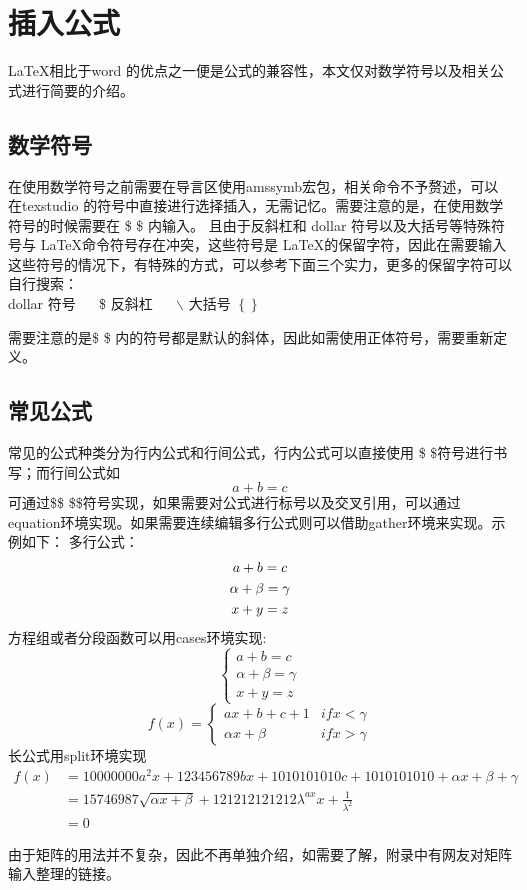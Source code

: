 \section{插入公式}
	\LaTeX 相比于word 的优点之一便是公式的兼容性，本文仅对数学符号以及相关公式进行简要的介绍。
	\subsection{数学符号}
	在使用数学符号之前需要在导言区使用amssymb宏包，相关命令不予赘述，可以在texstudio 的符号中直接进行选择插入，无需记忆。需要注意的是，在使用数学符号的时候需要在 \$ \$ 内输入。 且由于反斜杠和 dollar 符号以及大括号等特殊符号与 \LaTeX 命令符号存在冲突，这些符号是 \LaTeX 的保留字符，因此在需要输入这些符号的情况下，有特殊的方式，可以参考下面三个实力，更多的保留字符可以自行搜索：\\
	dollar 符号 ~~ \$  \hspace{5cm}	反斜杠 ~~ $\backslash$ \hspace{5cm}大括号    $\left\lbrace \right\rbrace$	 
	
	需要注意的是\$ \$ 内的符号都是默认的斜体，因此如需使用正体符号，需要重新定义。
	\subsection{常见公式} 
	常见的公式种类分为行内公式和行间公式，行内公式可以直接使用 \$ \$符号进行书写；而行间公式如$$a+b=c$$可通过\$\$ \quad \$\$符号实现，如果需要对公式进行标号以及交叉引用，可以通过equation环境实现。如果需要连续编辑多行公式则可以借助gather环境来实现。示例如下：
多行公式：
	\begin{gather}
		a+b=c \\
		\alpha + \beta =\gamma \notag \\
		x+y=z \notag
	\end{gather}
	方程组或者分段函数可以用cases环境实现:
	\begin{equation}
		\begin{cases}
			a+b=c \\
			\alpha + \beta =\gamma  \\
			x+y=z
		\end{cases} 
	\end{equation}
	\begin{equation}
		f(x)= 
		\begin{cases}
			ax+b+c+1 &if x<\gamma \\
			\alpha x + \beta &if x>\gamma 
		\end{cases} 
	\end{equation}
	长公式用split环境实现
	\begin{equation}
		\begin{split}
			f(x)&=10000000a^2x+123456789bx+1010101010c+1010101010+\alpha x + \beta + \gamma\\
			&=15746987\sqrt{\alpha x + \beta}+121212121212\lambda^{ax}x+\frac{1}{\lambda^2}\\
			&=0
		\end{split}
	\end{equation}
	
	由于矩阵的用法并不复杂，因此不再单独介绍，如需要了解，附录中有网友对矩阵输入整理的链接。